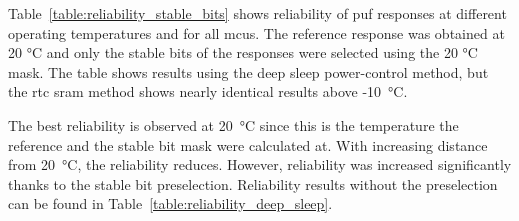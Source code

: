Table~\ref{table:reliability_stable_bits} shows reliability of \gls{puf} responses at different operating temperatures and for all \glspl{mcu}. The reference response was obtained at 20 °C and only the stable bits of the responses were selected using the 20 °C mask. The table shows results using the deep sleep power-control method, but the \gls{rtc} \gls{sram} method shows nearly identical results above -10~°C.

The best reliability is observed at 20~°C since this is the temperature the reference and the stable bit mask were calculated at. With increasing distance from 20~°C, the reliability reduces. However, reliability was increased significantly thanks to the stable bit preselection. Reliability results without the preselection can be found in Table~\ref{table:reliability_deep_sleep}.


